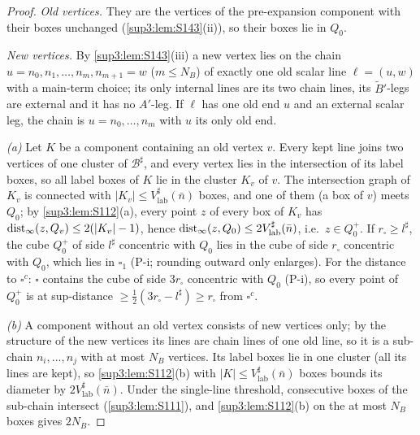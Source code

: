 \begin{proof}
\emph{Old vertices.} They are the vertices of the pre-expansion component with their boxes unchanged (\cref{sup3:lem:S143}(ii)), so their boxes lie in $Q_0$.

\emph{New vertices.} By \cref{sup3:lem:S143}(iii) a new vertex lies on the chain $u=n_0,n_1,\dots,n_m,n_{m+1}=w$ ($m\le N_B$) of exactly one old scalar line $\ell=(u,w)$ with a main-term choice; its only internal lines are its two chain lines, its $\tilde B'$-legs are external and it has no $A'$-leg. If $\ell$ has one old end $u$ and an external scalar leg, the chain is $u=n_0,\dots,n_m$ with $u$ its only old end.

\emph{(a)} Let $K$ be a component containing an old vertex $v$. Every kept line joins two vertices of one cluster of $\mathcal B^\sharp$, and every vertex lies in the intersection of its label boxes, so all label boxes of $K$ lie in the cluster $K_v$ of $v$. The intersection graph of $K_v$ is connected with $|K_v|\le V^\sharp_{\mathrm{lab}}(\bar n)$ boxes, and one of them (a box of $v$) meets $Q_0$; by \cref{sup3:lem:S112}(a), every point $z$ of every box of $K_v$ has $\operatorname{dist}_\infty(z,Q_v)\le2(|K_v|-1)$, hence $\operatorname{dist}_\infty(z,Q_0)\le2V^\sharp_{\mathrm{lab}}(\bar n)$, i.e.\ $z\in Q_0^+$. If $r_\square\ge l^\sharp$, the cube $Q_0^+$ of side $l^\sharp$ concentric with $Q_0$ lies in the cube of side $r_\square$ concentric with $Q_0$, which lies in $\square_1$ (P-i; rounding outward only enlarges). For the distance to $\square^c$: $\square$ contains the cube of side $3r_\square$ concentric with $Q_0$ (P-i), so every point of $Q_0^+$ is at sup-distance $\ge\frac12(3r_\square-l^\sharp)\ge r_\square$ from $\square^c$.

\emph{(b)} A component without an old vertex consists of new vertices only; by the structure of the new vertices its lines are chain lines of one old line, so it is a sub-chain $n_i,\dots,n_j$ with at most $N_B$ vertices. Its label boxes lie in one cluster (all its lines are kept), so \cref{sup3:lem:S112}(b) with $|K|\le V^\sharp_{\mathrm{lab}}(\bar n)$ boxes bounds its diameter by $2V^\sharp_{\mathrm{lab}}(\bar n)$. Under the single-line threshold, consecutive boxes of the sub-chain intersect (\cref{sup3:lem:S111}), and \cref{sup3:lem:S112}(b) on the at most $N_B$ boxes gives $2N_B$.
\end{proof}

